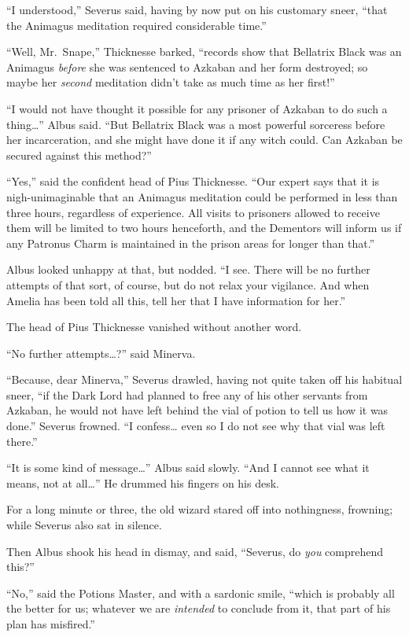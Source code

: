 ``I understood,'' Severus said, having by now put on his customary
sneer, ``that the Animagus meditation required considerable time.''

``Well, Mr.~Snape,'' Thicknesse barked, ``records show that Bellatrix
Black was an Animagus \emph{before} she was sentenced to Azkaban and her
form destroyed; so maybe her \emph{second} meditation didn't take as
much time as her first!''

``I would not have thought it possible for any prisoner of Azkaban to do
such a thing\ldots{}'' Albus said. ``But Bellatrix Black was a most
powerful sorceress before her incarceration, and she might have done it
if any witch could. Can Azkaban be secured against this method?''

``Yes,'' said the confident head of Pius Thicknesse. ``Our expert says
that it is nigh-unimaginable that an Animagus meditation could be
performed in less than three hours, regardless of experience. All visits
to prisoners allowed to receive them will be limited to two hours
henceforth, and the Dementors will inform us if any Patronus Charm is
maintained in the prison areas for longer than that.''

Albus looked unhappy at that, but nodded. ``I see. There will be no
further attempts of that sort, of course, but do not relax your
vigilance. And when Amelia has been told all this, tell her that I have
information for her.''

The head of Pius Thicknesse vanished without another word.

``No further attempts\ldots{}?'' said Minerva.

``Because, dear Minerva,'' Severus drawled, having not quite taken off
his habitual sneer, ``if the Dark Lord had planned to free any of his
other servants from Azkaban, he would not have left behind the vial of
potion to tell us how it was done.'' Severus frowned. ``I
confess\ldots{} even so I do not see why that vial was left there.''

``It is some kind of message\ldots{}'' Albus said slowly. ``And I cannot
see what it means, not at all\ldots{}'' He drummed his fingers on his
desk.

For a long minute or three, the old wizard stared off into nothingness,
frowning; while Severus also sat in silence.

Then Albus shook his head in dismay, and said, ``Severus, do \emph{you}
comprehend this?''

``No,'' said the Potions Master, and with a sardonic smile, ``which is
probably all the better for us; whatever we are \emph{intended} to
conclude from it, that part of his plan has misfired.''

